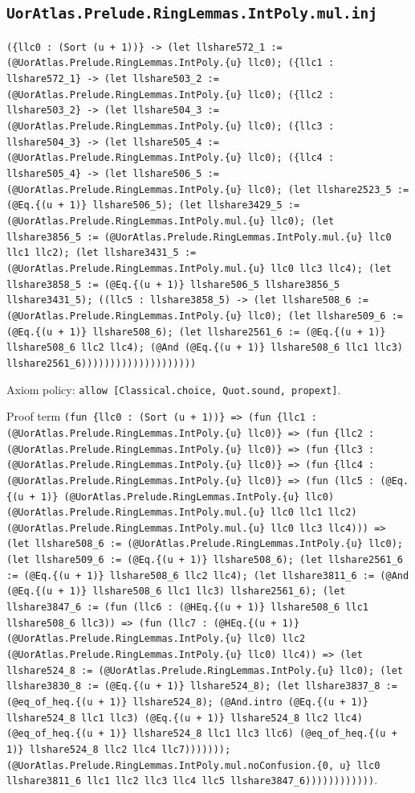 \documentclass[11pt]{article}
\begin{document}
\subsection*{\texttt{UorAtlas.Prelude.RingLemmas.IntPoly.mul.inj}}
\noindent\texttt{(\{llc0 : (Sort (u + 1))\} -> (let llshare572\_1 := (@UorAtlas.Prelude.RingLemmas.IntPoly.\{u\} llc0); (\{llc1 : llshare572\_1\} -> (let llshare503\_2 := (@UorAtlas.Prelude.RingLemmas.IntPoly.\{u\} llc0); (\{llc2 : llshare503\_2\} -> (let llshare504\_3 := (@UorAtlas.Prelude.RingLemmas.IntPoly.\{u\} llc0); (\{llc3 : llshare504\_3\} -> (let llshare505\_4 := (@UorAtlas.Prelude.RingLemmas.IntPoly.\{u\} llc0); (\{llc4 : llshare505\_4\} -> (let llshare506\_5 := (@UorAtlas.Prelude.RingLemmas.IntPoly.\{u\} llc0); (let llshare2523\_5 := (@Eq.\{(u + 1)\} llshare506\_5); (let llshare3429\_5 := (@UorAtlas.Prelude.RingLemmas.IntPoly.mul.\{u\} llc0); (let llshare3856\_5 := (@UorAtlas.Prelude.RingLemmas.IntPoly.mul.\{u\} llc0 llc1 llc2); (let llshare3431\_5 := (@UorAtlas.Prelude.RingLemmas.IntPoly.mul.\{u\} llc0 llc3 llc4); (let llshare3858\_5 := (@Eq.\{(u + 1)\} llshare506\_5 llshare3856\_5 llshare3431\_5); ((llc5 : llshare3858\_5) -> (let llshare508\_6 := (@UorAtlas.Prelude.RingLemmas.IntPoly.\{u\} llc0); (let llshare509\_6 := (@Eq.\{(u + 1)\} llshare508\_6); (let llshare2561\_6 := (@Eq.\{(u + 1)\} llshare508\_6 llc2 llc4); (@And (@Eq.\{(u + 1)\} llshare508\_6 llc1 llc3) llshare2561\_6))))))))))))))))))))}\par
\noindent Axiom policy: \texttt{allow [Classical.choice, Quot.sound, propext]}.\par
\noindent Proof term \texttt{(fun \{llc0 : (Sort (u + 1))\} => (fun \{llc1 : (@UorAtlas.Prelude.RingLemmas.IntPoly.\{u\} llc0)\} => (fun \{llc2 : (@UorAtlas.Prelude.RingLemmas.IntPoly.\{u\} llc0)\} => (fun \{llc3 : (@UorAtlas.Prelude.RingLemmas.IntPoly.\{u\} llc0)\} => (fun \{llc4 : (@UorAtlas.Prelude.RingLemmas.IntPoly.\{u\} llc0)\} => (fun (llc5 : (@Eq.\{(u + 1)\} (@UorAtlas.Prelude.RingLemmas.IntPoly.\{u\} llc0) (@UorAtlas.Prelude.RingLemmas.IntPoly.mul.\{u\} llc0 llc1 llc2) (@UorAtlas.Prelude.RingLemmas.IntPoly.mul.\{u\} llc0 llc3 llc4))) => (let llshare508\_6 := (@UorAtlas.Prelude.RingLemmas.IntPoly.\{u\} llc0); (let llshare509\_6 := (@Eq.\{(u + 1)\} llshare508\_6); (let llshare2561\_6 := (@Eq.\{(u + 1)\} llshare508\_6 llc2 llc4); (let llshare3811\_6 := (@And (@Eq.\{(u + 1)\} llshare508\_6 llc1 llc3) llshare2561\_6); (let llshare3847\_6 := (fun (llc6 : (@HEq.\{(u + 1)\} llshare508\_6 llc1 llshare508\_6 llc3)) => (fun (llc7 : (@HEq.\{(u + 1)\} (@UorAtlas.Prelude.RingLemmas.IntPoly.\{u\} llc0) llc2 (@UorAtlas.Prelude.RingLemmas.IntPoly.\{u\} llc0) llc4)) => (let llshare524\_8 := (@UorAtlas.Prelude.RingLemmas.IntPoly.\{u\} llc0); (let llshare3830\_8 := (@Eq.\{(u + 1)\} llshare524\_8); (let llshare3837\_8 := (@eq\_of\_heq.\{(u + 1)\} llshare524\_8); (@And.intro (@Eq.\{(u + 1)\} llshare524\_8 llc1 llc3) (@Eq.\{(u + 1)\} llshare524\_8 llc2 llc4) (@eq\_of\_heq.\{(u + 1)\} llshare524\_8 llc1 llc3 llc6) (@eq\_of\_heq.\{(u + 1)\} llshare524\_8 llc2 llc4 llc7))))))); (@UorAtlas.Prelude.RingLemmas.IntPoly.mul.noConfusion.\{0, u\} llc0 llshare3811\_6 llc1 llc2 llc3 llc4 llc5 llshare3847\_6))))))))))))}.\par
\end{document}
